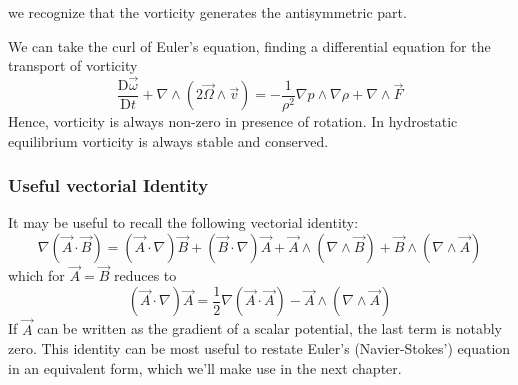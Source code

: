 we recognize that the vorticity generates the antisymmetric part.
\par We can take the curl of Euler's equation, finding a differential equation for the transport of vorticity
\begin{equation}
    \frac{\text{D}\vec{\omega}}{\text{D}t} +\nabla\wedge(2\vec{\Omega} \wedge \vec{v}) = -\frac{1}{\rho^{2}}\nabla p \wedge \nabla \rho +\nabla \wedge \vec{F}
    \label{eq:vorticity}
\end{equation}
Hence, vorticity is always non-zero in presence of rotation. In hydrostatic equilibrium vorticity is always stable and conserved.
\subsubsection*{Useful vectorial Identity}
It may be useful to recall the following vectorial identity:
\begin{equation*}
    \nabla(\vec{A}\cdot\vec{B}) = (\vec{A}\cdot\nabla)\vec{B}+(\vec{B}\cdot\nabla)\vec{A}+\vec{A}\wedge (\nabla\wedge\vec{B})+\vec{B}\wedge (\nabla\wedge\vec{A})
\end{equation*}
which for $\vec{A} = \vec{B}$ reduces to
\begin{equation*}
    (\vec{A}\cdot\nabla)\vec{A} = \frac{1}{2}\nabla(\vec{A}\cdot\vec{A}) - \vec{A}\wedge (\nabla\wedge\vec{A})
\end{equation*}
If $\vec{A}$ can be written as the gradient of a scalar potential, the last term is notably zero. This identity can be most useful to restate Euler's (Navier-Stokes') equation in an equivalent form, which we'll make use in the next chapter.